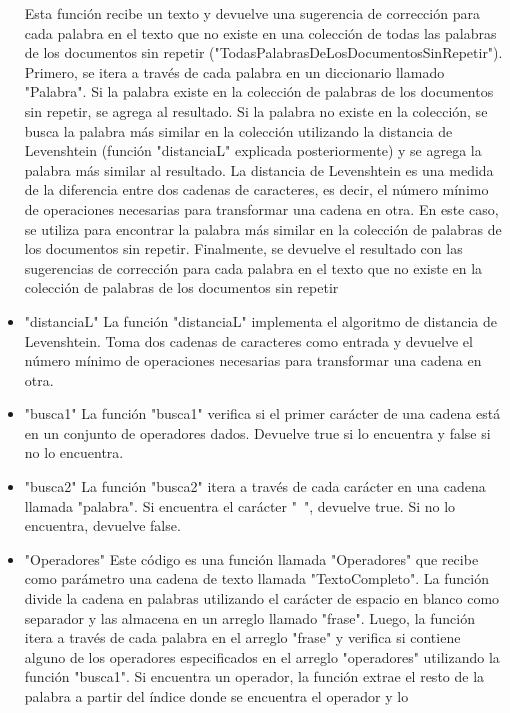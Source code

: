 \documentclass{article}
\begin{document}
\begin{itemize}
    Esta función recibe un texto y devuelve una sugerencia de corrección para 
    cada palabra en el texto que no existe en una colección de todas las palabras 
    de los documentos sin repetir ("TodasPalabrasDeLosDocumentosSinRepetir"). 
    Primero, se itera a través de cada palabra en un diccionario llamado "Palabra". 
    Si la palabra existe en la colección de palabras de los documentos sin repetir, 
    se agrega al resultado. Si la palabra no existe en la colección, se busca la 
    palabra más similar en la colección utilizando la distancia de Levenshtein 
    (función "distanciaL" explicada posteriormente) y se agrega la palabra más 
    similar al resultado. 
    La distancia de Levenshtein es una medida de la diferencia entre dos cadenas 
    de caracteres, es decir, el número mínimo de operaciones necesarias para 
    transformar una cadena en otra. En este caso, se utiliza para encontrar la 
    palabra más similar en la colección de palabras de los documentos sin repetir. 
    Finalmente, se devuelve el resultado con las sugerencias de corrección para 
    cada palabra en el texto que no existe en la colección de palabras de los 
    documentos sin repetir 
    \item "distanciaL" 
    La función "distanciaL" implementa el algoritmo de distancia de Levenshtein. 
    Toma dos cadenas de caracteres como entrada y devuelve el número mínimo 
    de operaciones necesarias para transformar una cadena en otra.
    \item "busca1" 
    La función "busca1" verifica si el primer carácter de una cadena está en un 
    conjunto de operadores dados. Devuelve true si lo encuentra y false si no lo 
    encuentra.
    \item "busca2" 
    La función "busca2" itera a través de cada carácter en una cadena llamada 
   "palabra". Si encuentra el carácter "~", devuelve true. Si no lo encuentra, 
   devuelve false. 
   \item "Operadores" 
   Este código es una función llamada "Operadores" que recibe como parámetro 
   una cadena de texto llamada "TextoCompleto". La función divide la cadena en 
   palabras utilizando el carácter de espacio en blanco como separador y las 
   almacena en un arreglo llamado "frase". 
   Luego, la función itera a través de cada palabra en el arreglo "frase" y verifica si 
   contiene alguno de los operadores especificados en el arreglo "operadores" 
   utilizando la función "busca1". Si encuentra un operador, la función extrae el 
   resto de la palabra a partir del índice donde se encuentra el operador y lo 

\end{itemize}
\end{document}

